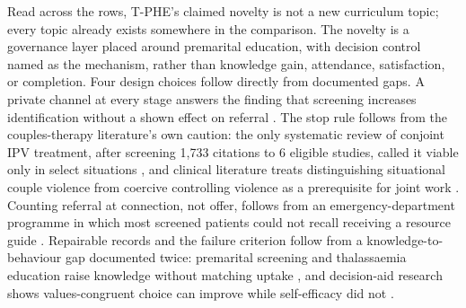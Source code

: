 \documentclass[11pt]{article}
\newcommand{\tphe}{T\mbox{-}PHE}
\begin{document}
Read across the rows, \tphe{}'s claimed novelty is not a new curriculum topic; every topic already exists somewhere in the comparison. The novelty is a governance layer placed around premarital education, with decision control named as the mechanism, rather than knowledge gain, attendance, satisfaction, or completion. Four design choices follow directly from documented gaps. A private channel at every stage answers the finding that screening increases identification without a shown effect on referral \cite{ref38,ref39}. The stop rule follows from the couples-therapy literature's own caution: the only systematic review of conjoint IPV treatment, after screening 1{,}733 citations to 6 eligible studies, called it viable only in select situations \cite{ref45}, and clinical literature treats distinguishing situational couple violence from coercive controlling violence as a prerequisite for joint work \cite{ref46,ref47}. Counting referral at connection, not offer, follows from an emergency-department programme in which most screened patients could not recall receiving a resource guide \cite{ref173}. Repairable records and the failure criterion follow from a knowledge-to-behaviour gap documented twice: premarital screening and thalassaemia education raise knowledge without matching uptake \cite{ref12,ref13}, and decision-aid research shows values-congruent choice can improve while self-efficacy did not \cite{ref14,ref120}.
\end{document}
